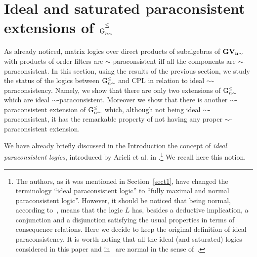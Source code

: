 \documentclass{article}
\theoremstyle{definition}
\newcommand{\Gnsimleq}{\mathrm{G}\mystrut^{\text{\tiny $\leq$}}_{n\sim}}
\newcommand\mystrut{\rule{0pt}{7pt}}
\newcommand\mystrutsec{\rule{0pt}{12pt}}
\begin{document}
\section{Ideal and saturated paraconsistent extensions of $\mathrm{G}\mystrutsec^{\text{\footnotesize $\leq$}}_{n\sim}$} \label{ideal}

 As already noticed,  matrix logics over direct products of subalgebras of $\bf GV_{n \sim}$ with products of order filters are $\sim$-paraconsistent iff all the components are $\sim$-paraconsistent. In this section, using the results of the previous section, we study the status of the logics between $\Gnsimleq$ and CPL in relation to ideal $\sim$-paraconsistency. Namely, we  show that there are only two extensions of $\Gnsimleq$ which are ideal $\sim$-paraconsistent. Moreover we show that there is another $\sim$-paraconsistent extension of $\Gnsimleq$  which, although not being ideal $\sim$-paraconsistent, it has the remarkable property of not having any proper $\sim$-paraconsistent extension.


We have already briefly discussed in the Introduction  the concept of {\em ideal paraconsistent logics},  introduced by Arieli et al.  in   \cite{ArieliAZ11a}.\footnote{The authors, as it was mentioned in Section~\ref{sect1},  have changed the terminology ``ideal paraconsistent logic'' to ``fully maximal and normal paraconsistent logic''. However, it should be noticed that being normal, according to~\cite[Definition~1.32]{AAZbook}, means that the logic $L$ has, besides a deductive implication, a conjunction and a disjunction satisfying the usual properties in terms of consequence relations. Here we decide to keep the original definition of ideal paraconsistency. It is worth noting that all the ideal (and saturated) logics considered in this paper and in~\cite{CoEsGiGo} are normal in the sense of~\cite{AAZbook}.} We recall here this notion.
\end{document}
